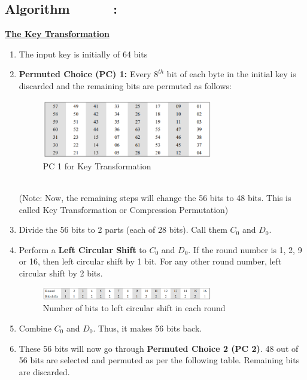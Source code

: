 \documentclass[a4paper]{report} %
\begin{document}
\subsection{Algorithm~\cite{book}~\cite{book1}~\cite{youtube}~\cite{youtube2}~\cite{youtube3}~\cite{youtube4}:}
\begin{center}
    \underline{\textbf{The Key Transformation}}
\end{center}
\begin{enumerate}
    \item The input key is initially of 64 bits 
    \item \textbf{Permuted Choice (PC) 1:} Every $8^{th}$ bit of each byte in the initial key is discarded and the remaining bits are permuted as follows: \\ 
    \begin{figure}[h]
    \centering
    \includegraphics[width=0.7\textwidth]{images/PC1_DES.PNG}
    \caption{PC 1 for Key Transformation }
    \end{figure}\\
    (Note: Now, the remaining steps will change the 56 bits to 48 bits. This is called Key Transformation or Compression Permutation) 
    \item Divide the 56 bits to 2 parts (each of 28 bits). Call them $C_0$ and $D_0$.
    \item Perform a \textbf{Left Circular Shift} to $C_0$ and $D_0$. If the round number is 1, 2, 9 or 16, then left circular shift by 1 bit. For any other round number, left circular shift by 2 bits. 
    \begin{figure}[h]
    \centering
    \includegraphics[width=0.7\textwidth]{images/LCS_DES.PNG}
    \caption{Number of bits to left circular shift in each round}
    \end{figure}
    \item Combine $C_0$ and $D_0$. Thus, it makes 56 bits back. 
    \item These 56 bits will now go through \textbf{Permuted Choice 2 (PC 2)}. 48 out of 56 bits are selected and permuted as per the following table. Remaining bits are discarded. \\ 

\end{enumerate}
\end{document}
